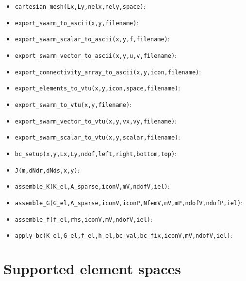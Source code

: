 \begin{itemize}
\begin{itemize}
\item \lstinline{cartesian_mesh(Lx,Ly,nelx,nely,space)}:
\item \lstinline{export_swarm_to_ascii(x,y,filename)}:
\item \lstinline{export_swarm_scalar_to_ascii(x,y,f,filename)}:
\item \lstinline{export_swarm_vector_to_ascii(x,y,u,v,filename)}:
\item \lstinline{export_connectivity_array_to_ascii(x,y,icon,filename)}:
\item \lstinline{export_elements_to_vtu(x,y,icon,space,filename)}:
\item \lstinline{export_swarm_to_vtu(x,y,filename)}:
\item \lstinline{export_swarm_vector_to_vtu(x,y,vx,vy,filename)}:
\item \lstinline{export_swarm_scalar_to_vtu(x,y,scalar,filename)}:
\item \lstinline{bc_setup(x,y,Lx,Ly,ndof,left,right,bottom,top)}:
\item \lstinline{J(m,dNdr,dNds,x,y)}:
\item \lstinline{assemble_K(K_el,A_sparse,iconV,mV,ndofV,iel)}:
\item \lstinline{assemble_G(G_el,A_sparse,iconV,iconP,NfemV,mV,mP,ndofV,ndofP,iel)}:
\item \lstinline{assemble_f(f_el,rhs,iconV,mV,ndofV,iel)}:
\item \lstinline{apply_bc(K_el,G_el,f_el,h_el,bc_val,bc_fix,iconV,mV,ndofV,iel)}:
\end{itemize}


\end{itemize}

\newpage
\section*{Supported element spaces}

